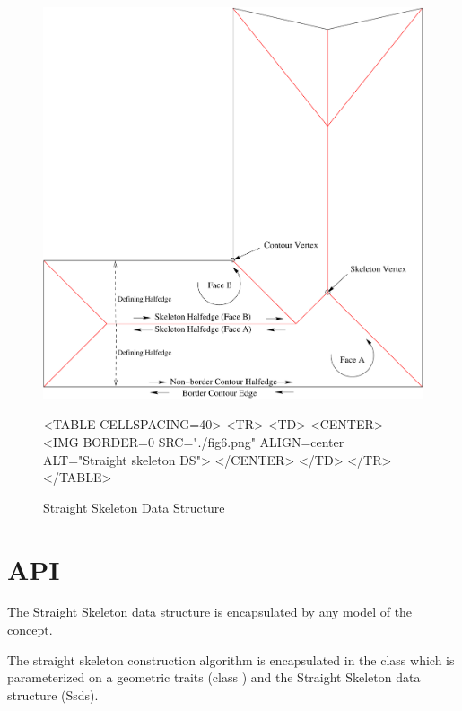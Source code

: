 \begin{figure}[htbp]
\begin{ccTexOnly}
\begin{center}
\includegraphics{Straight_skeleton_2/fig6} %
\end{center}
\end{ccTexOnly}

\begin{ccHtmlOnly}
<TABLE CELLSPACING=40>
<TR>
<TD>
<CENTER>
<IMG BORDER=0 SRC="./fig6.png" ALIGN=center ALT="Straight skeleton DS">
</CENTER>
</TD>
</TR>
</TABLE>
\end{ccHtmlOnly}

\caption{Straight Skeleton Data Structure
\label{Simplepoly-offsets}}
\end{figure}

\section{API}

The Straight Skeleton data structure is encapsulated by any model of the  concept.

The straight skeleton construction algorithm is encapsulated in the
class  which is
parameterized on a geometric traits (class
) and the Straight
Skeleton data structure (Ssds).

